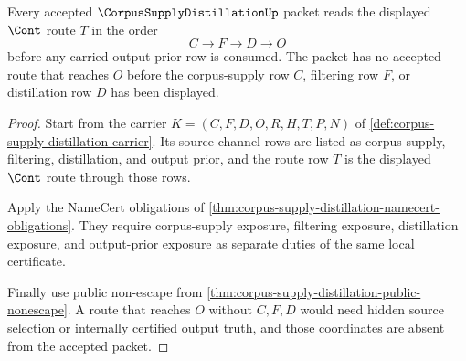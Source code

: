 \begin{theorem}
\label{thm:corpus-supply-distillation-filter-route-order}
Every accepted $\CorpusSupplyDistillationUp$ packet reads the displayed $\Cont$ route $T$ in the order
$$
C \longrightarrow F \longrightarrow D \longrightarrow O
$$
before any carried output-prior row is consumed. The packet has no accepted route that reaches $O$ before the corpus-supply row $C$, filtering row $F$, or distillation row $D$ has been displayed.
\end{theorem}
\begin{proof}
Start from the carrier $K=(C,F,D,O,R,H,T,P,N)$ of \autoref{def:corpus-supply-distillation-carrier}. Its source-channel rows are listed as corpus supply, filtering, distillation, and output prior, and the route row $T$ is the displayed $\Cont$ route through those rows.

Apply the NameCert obligations of \autoref{thm:corpus-supply-distillation-namecert-obligations}. They require corpus-supply exposure, filtering exposure, distillation exposure, and output-prior exposure as separate duties of the same local certificate.

Finally use public non-escape from \autoref{thm:corpus-supply-distillation-public-nonescape}. A route that reaches $O$ without $C,F,D$ would need hidden source selection or internally certified output truth, and those coordinates are absent from the accepted packet.
\end{proof}

